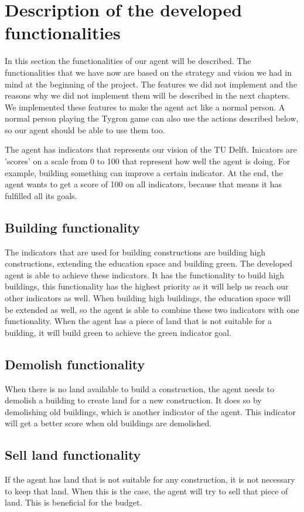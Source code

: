 \chapter{Description of the developed functionalities}
In this section the functionalities of our agent will be described.
The functionalities that we have now are based on the strategy and vision we had in mind at the beginning of the project.
The features we did not implement and the reasons why we did not implement them will be described in the next chapters. 
We implemented these features to make the agent act like a normal person.
A normal person playing the Tygron game can also use the actions described below, so our agent should be able to use them too.

The agent has indicators that represents our vision of the TU Delft.
Inicators are 'scores' on a scale from 0 to 100 that represent how well the agent is doing.
For example, building something can improve a certain indicator.
At the end, the agent wants to get a score of 100 on all indicators, because that means it has fulfilled all its goals.

\section{Building functionality}
The indicators that are used for building constructions are building high constructions, extending the education space and building green.
The developed agent is able to achieve these indicators. 
It has the functionality to build high buildings, this functionality has the highest priority as it will help us reach our other indicators as well.
When building high buildings, the education space will be extended as well, so the agent is able to combine these two indicators with one functionality.
When the agent has a piece of land that is not suitable for a building, it will build green to achieve the green indicator goal.

\section{Demolish functionality}
When there is no land available to build a construction, the agent needs to demolish a building to create land for a new construction.
It does so by demolishing old buildings, which is another indicator of the agent.
This indicator will get a better score when old buildings are demolished.

\section{Sell land functionality}
If the agent has land that is not suitable for any construction, it is not necessary to keep that land. When this is the case, the agent will try to sell that piece of land. This is beneficial for the budget.

